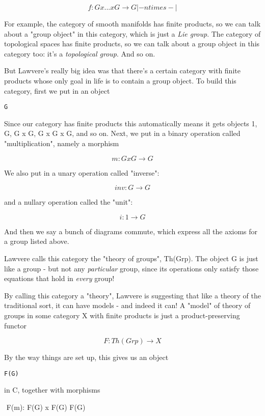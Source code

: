 $$
f: G x  ...  x G \to  G
   |- n times -|
$$
    

For example, the category of smooth manifolds has finite products, so
we can talk about a "group object" in this category, which
is just a \emph{Lie group}.  The category of topological spaces has
finite products, so we can talk about a group object in this category
too: it's a \emph{topological group}.  And so on.

But Lawvere's really big idea was that there's a certain category
with finite products whose only goal in life is to contain a group
object.  To build this category, first we put in an object 

\begin{verbatim}
G
\end{verbatim}
    
Since our category has finite products this automatically means
it gets objects 1, G, G x G, G x G x G, and so on.  Next, we put in 
a binary operation called "multiplication", namely a morphism

$$
m: G x G \to  G
$$
    
We also put in a unary operation called "inverse":

$$
inv: G \to  G
$$
    
and a nullary operation called the "unit":

$$
i: 1 \to  G
$$
    
And then we say a bunch of diagrams commute, which express all
the axioms for a group listed above.

Lawvere calls this category the "theory of groups", Th(Grp).
The object G is just like a group - but not any \emph{particular} group,
since its operations only satisfy those equations that hold in \emph{every}
group!

By calling this category a "theory", Lawvere is suggesting
that like a theory of the traditional sort, it can have models - and
indeed it can!  A "model" of theory of groups in some
category X with finite products is just a product-preserving functor

$$
F: Th(Grp) \to  X
$$
    
By the way things are set up, this gives us an object

\begin{verbatim}
F(G)
\end{verbatim}
    
in C, together with morphisms

$$
F(m): F(G) x F(G) \to  F(G)

